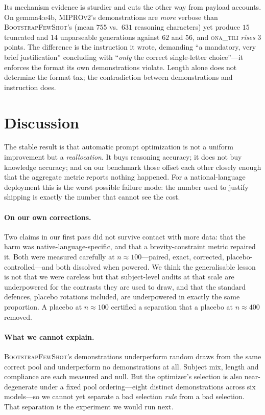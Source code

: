 \documentclass[11pt]{article}
\newcommand{\ona}{\textsc{ona\_tili}}
\newcommand{\bsfs}{\textsc{BootstrapFewShot}}
\begin{document}
Its mechanism evidence is sturdier and cuts the other way from payload accounts. On
gemma4:e4b, \textsc{MIPROv2}'s demonstrations are \emph{more} verbose than \bsfs{}'s
(mean $755$ vs.\ $631$ reasoning characters) yet produce $15$ truncated and $14$
unparseable generations against $62$ and $56$, and \ona{} \emph{rises} $3$ points. The
difference is the instruction it wrote, demanding ``a mandatory, very brief
justification'' concluding with ``\emph{only} the correct single-letter choice''---it
enforces the format its own demonstrations violate. Length alone does not determine the
format tax; the contradiction between demonstrations and instruction does.

\section{Discussion}

The stable result is that automatic prompt optimization is not a uniform improvement but
a \emph{reallocation}. It buys reasoning accuracy; it does not buy knowledge accuracy;
and on our benchmark those offset each other closely enough that the aggregate metric
reports nothing happened. For a national-language deployment this is the worst possible failure mode: the
number used to justify shipping is exactly the number that cannot see the cost.

\paragraph{On our own corrections.} Two claims in our first pass did not survive
contact with more data: that the harm was native-language-specific, and that a
brevity-constraint metric repaired it. Both were measured carefully at
$n{\approx}100$---paired, exact, corrected, placebo-controlled---and both dissolved when
powered. We think the generalisable lesson is not that we were careless but that
subject-level audits at that scale are underpowered for the contrasts they are used to
draw, and that the standard defences, placebo rotations included, are underpowered in
exactly the same proportion. A placebo at $n{\approx}100$ certified a separation that a
placebo at $n{\approx}400$ removed.

\paragraph{What we cannot explain.} \bsfs{}'s demonstrations underperform random draws
from the same correct pool and underperform no demonstrations at all. Subject mix, length
and compliance are each measured and null. But the optimizer's selection is also
near-degenerate under a fixed pool ordering---eight distinct demonstrations across six
models---so we cannot yet separate a bad selection \emph{rule} from a bad selection.
That separation is the experiment we would run next.
\end{document}
